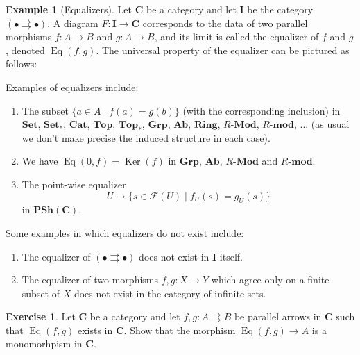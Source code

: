 \documentclass[12pt,a4paper]{amsart}
\theoremstyle{plain}
\theoremstyle{definition}
\newtheorem{exmp}[thm]{Example}
\newtheorem{xca}[thm]{Exercise}
\theoremstyle{remark}
\begin{document}
\begin{exmp}[Equalizers]
  Let $\mathbf{C}$ be a category and let $\mathbf{I}$ be the category $(\bullet \rightrightarrows \bullet)$.
  A diagram $F \colon \mathbf{I} \to \mathbf{C}$ corresponds to the data of two parallel morphisms $f \colon A \to B$ and $g \colon A \to B$, and its limit is called the equalizer of $f$ and $g$, denoted $\operatorname{Eq}(f,g)$.
  The universal property of the equalizer can be pictured as follows:
  \begin{center}
  \end{center}
  Examples of equalizers include:
  \begin{enumerate}
    \item The subset $\{ a \in A \mid f(a) = g(b) \}$ (with the corresponding inclusion) in $\mathbf{Set}$, $\mathbf{Set}_{*}$, $\mathbf{Cat}$, $\mathbf{Top}$, $\mathbf{Top}_{*}$, $\mathbf{Grp}$, $\mathbf{Ab}$, $\mathbf{Ring}$, $R$-$\mathbf{Mod}$, $R$-$\mathbf{mod}$, ... (as usual we don't make precise the induced structure in each case).
    \item We have $\operatorname{Eq}(0,f) = \operatorname{Ker}(f)$ in $\mathbf{Grp}$, $\mathbf{Ab}$, $R$-$\mathbf{Mod}$ and $R$-$\mathbf{mod}$.
    \item The point-wise equalizer
      \[ U \mapsto \{ s \in \mathscr{F}(U) \mid f_{U}(s) = g_{U}(s) \} \]
      in $\mathbf{PSh}(\mathbf{C})$.
  \end{enumerate}
  Some examples in which equalizers do not exist include:
  \begin{enumerate} 
    \item The equalizer of $(\bullet \rightrightarrows \bullet)$ does not exist in $\mathbf{I}$ itself.
    \item The equalizer of two morphisms $f, g \colon X \to Y$ which agree only on a finite subset of $X$ does not exist in the category of infinite sets.
  \end{enumerate}
\end{exmp}

\begin{xca}
  Let $\mathbf{C}$ be a category and let $f, g \colon A \rightrightarrows B$ be parallel arrows in $\mathbf{C}$ such that $\operatorname{Eq}(f,g)$ exists in $\mathbf{C}$.
  Show that the morphism $\operatorname{Eq}(f,g) \to A$ is a monomorhpism in $\mathbf{C}$.
\end{xca}
\end{document}
